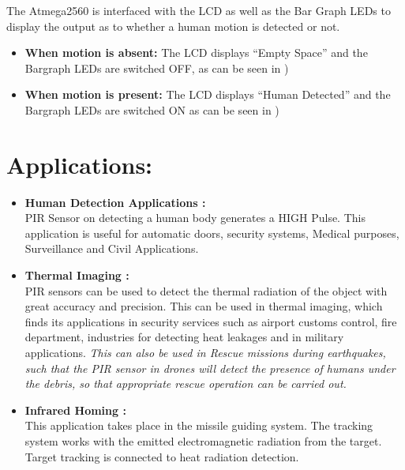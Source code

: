 \documentclass[a4paper,12 pt]{article}
\begin{document}
The Atmega2560 is interfaced with the LCD as well as the Bar Graph LEDs to display the output as to whether a human motion is detected or not.
\begin{itemize}
\item \textbf{When motion is absent:}
The LCD displays “Empty Space” and the Bargraph LEDs are switched OFF, as can be seen in  )

\item \textbf{When motion is present:}
The LCD displays “Human Detected” and the Bargraph LEDs are switched ON as can be seen in )
\end{itemize}
\pagebreak

\section{Applications:}
\begin{itemize}
\item \textbf{Human Detection Applications : }\\
PIR Sensor on detecting a human body generates a HIGH Pulse. This application is useful for automatic doors, security systems, Medical purposes, Surveillance and Civil Applications.

\item \textbf{Thermal Imaging :}\\
PIR sensors can be used to detect the thermal radiation of the object with great accuracy and precision. This can be used in thermal imaging, which finds its applications in security services such as airport customs control, fire department, industries for detecting heat leakages and in military applications. \textit{ This can also be used in Rescue missions during earthquakes, such that the PIR sensor in drones will detect the presence of humans under the debris, so that appropriate rescue operation can be carried out.}

\item \textbf{Infrared Homing :}\\
This application takes place in the missile guiding system. The tracking system works with the emitted electromagnetic radiation from the target. Target tracking is connected to heat radiation detection.
\end{itemize}
\end{document}

